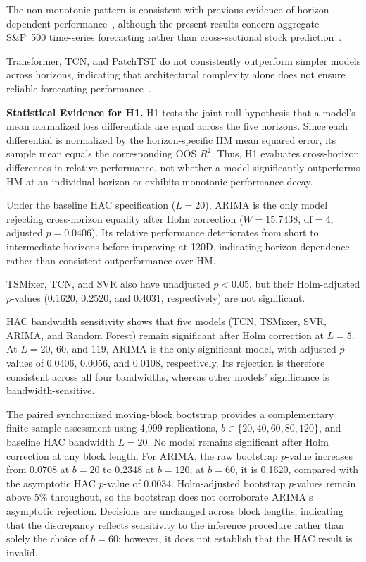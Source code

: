 \documentclass[runningheads,orivec]{llncs}
\begin{document}
The non-monotonic pattern is consistent with previous evidence of horizon-dependent performance~\cite{quaedvlieg2021,xu2020}, although the present results concern aggregate S\&P~500 time-series forecasting rather than cross-sectional stock prediction~\cite{nechvatalova2024}.

Transformer, TCN, and PatchTST do not consistently outperform simpler models across horizons, indicating that architectural complexity alone does not ensure reliable forecasting performance~\cite{gu2020,welch2008}.

\medskip
\noindent\textbf{Statistical Evidence for H1.} H1 tests the joint null hypothesis that a model's mean normalized loss differentials are equal across the five horizons. Since each differential is normalized by the horizon-specific HM mean squared error, its sample mean equals the corresponding OOS $R^2$. Thus, H1 evaluates cross-horizon differences in relative performance, not whether a model significantly outperforms HM at an individual horizon or exhibits monotonic performance decay.

Under the baseline HAC specification ($L=20$), ARIMA is the only model rejecting cross-horizon equality after Holm correction ($W=15.7438$, $\mathrm{df}=4$, adjusted $p=0.0406$). Its relative performance deteriorates from short to intermediate horizons before improving at 120D, indicating horizon dependence rather than consistent outperformance over HM.

TSMixer, TCN, and SVR also have unadjusted $p<0.05$, but their Holm-adjusted $p$-values (0.1620, 0.2520, and 0.4031, respectively) are not significant.

HAC bandwidth sensitivity shows that five models (TCN, TSMixer, SVR, ARIMA, and Random Forest) remain significant after Holm correction at $L=5$. At $L=20$, $60$, and $119$, ARIMA is the only significant model, with adjusted $p$-values of 0.0406, 0.0056, and 0.0108, respectively. Its rejection is therefore consistent across all four bandwidths, whereas other models' significance is bandwidth-sensitive.

The paired synchronized moving-block bootstrap provides a complementary finite-sample assessment using 4,999 replications, $b\in\{20,40,60,80,120\}$, and baseline HAC bandwidth $L=20$. No model remains significant after Holm correction at any block length. For ARIMA, the raw bootstrap $p$-value increases from 0.0708 at $b=20$ to 0.2348 at $b=120$; at $b=60$, it is 0.1620, compared with the asymptotic HAC $p$-value of 0.0034. Holm-adjusted bootstrap $p$-values remain above 5\% throughout, so the bootstrap does not corroborate ARIMA's asymptotic rejection. Decisions are unchanged across block lengths, indicating that the discrepancy reflects sensitivity to the inference procedure rather than solely the choice of $b=60$; however, it does not establish that the HAC result is invalid.
\end{document}
